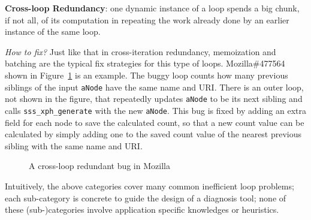 {\textbf{Cross-loop Redundancy}}:
one dynamic instance of a loop spends a big chunk, if not all, of its
computation in repeating the work already done by an
earlier instance of the same loop.

{\textit{How to fix?}}
Just like that in cross-iteration redundancy, memoization and batching
are the typical fix strategies for this type of loops.
Mozilla\#477564 shown in Figure~\ref{fig:Mozilla477564} is an example. 
The buggy loop counts how many previous siblings of the input \texttt{aNode} have the same name and URI. 
There is an outer loop, not shown in the figure, that repeatedly updates
\texttt{aNode} to be its next sibling and calls
\texttt{sss\_xph\_generate} with the new \texttt{aNode}. 
This bug is fixed by adding an extra field for each node to save the calculated 
count, so that a new count value can be calculated by simply adding one to the
saved count value of the nearest previous sibling with the same name and URI.

\begin{figure}
\centering
{}
  \mbox{}
\caption{A cross-loop redundant bug in Mozilla }
\vspace{-0.05in}
\label{fig:Mozilla477564}
\end{figure}



Intuitively, the above categories cover many common inefficient
loop problems; each sub-category is concrete to guide the design of a
diagnosis tool; none of these (sub-)categories involve application
specific knowledges or heuristics.
